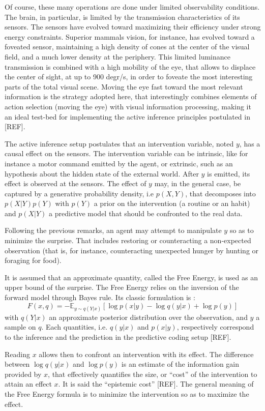 \documentclass[runningheads]{llncs}
\begin{document}
Of course, these many operations are done under limited observability conditions. The brain, in particular, is limited by the transmission characteristics of its sensors. The sensors have evolved toward maximizing their efficiency under strong energy constraints. Superior mammals vision, for instance, has evolved toward a foveated sensor, maintaining a high density of cones at the center of the visual field, and a much lower density at the periphery. This limited luminance transmission is combined with a high mobility of the eye, that allows to displace the center of sight, at up to 900 degr/s, in order to foveate the most interesting parts of the total visual scene. Moving the eye fast toward the most relevant information is the strategy adopted here, that interestingly combines elements of action selection (moving the eye) with visual information processing, making it an ideal test-bed for implementing the active inference principles postulated in [REF].

The active inference setup postulates that an intervention variable, noted $y$, has a causal effect on the sensors. The intervention variable can be intrinsic, like for instance a motor command emitted by the agent, or extrinsic, such as an hypothesis about the hidden state of the external world. After $y$ is emitted, its effect is observed at the sensors. The effect of $y$ may, in the general case, be captured by a generative probability density, i.e $p(X,Y)$, that decomposes into $p(X|Y)p(Y)$ with $p(Y)$ a prior on the intervention (a routine or an habit) and $p(X|Y)$ a predictive model that should be confronted to the real data. 


Following the previous remarks, an agent may attempt to manipulate $y$ so as to minimize the surprise. That includes  restoring or counteracting a non-expected observation (that is, for instance, counteracting unexpected hunger by hunting or foraging for food). 

It is assumed that an approximate quantity, called the Free Energy, is used as an upper bound of the surprise. The Free Energy relies on the inversion of the forward model through Bayes rule. Its classic formulation is :
$$F(x,q) = - \mathbb{E}_{y \sim q(Y|x)} [\log p(x|y) - \log q(y|x) + \log p(y)]$$
with $q(Y|x)$ an approximate posterior distribution over the observation, and $y$ a sample on $q$. Each quantities, i.e. $q(y|x)$ and $p(x|y)$, respectively correspond to the inference and the prediction in the predictive coding setup [REF]. 

Reading $x$ allows then to confront an intervention with its effect. The difference between $\log q(y|x)$ and $\log p(y)$ is an estimate of the information gain provided by $x$, that effectively quantifies the size, or ``cost'' of the intervention to attain an effect $x$. It is said the ``epistemic cost'' [REF]. The general meaning of the Free Energy formula is to minimize the intervention so as to maximize the effect.
\end{document}
